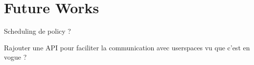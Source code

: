 \section{Future Works}
\par Scheduling de policy ?
\par Rajouter une API pour faciliter la communication avec userspaces vu que c'est en vogue ?
